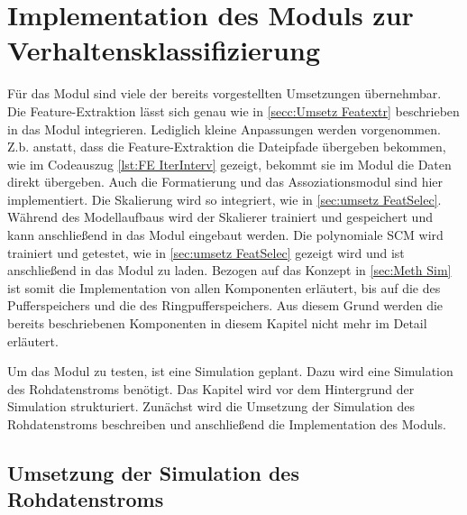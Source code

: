 \section{Implementation des Moduls zur Verhaltensklassifizierung} \label{sec:umse ModulKonzept}
Für das Modul sind viele der bereits vorgestellten Umsetzungen übernehmbar. Die Feature-Extraktion lässt sich genau wie in \autoref{secc:Umsetz Featextr} beschrieben in das Modul integrieren. Lediglich kleine Anpassungen werden vorgenommen. Z.b. anstatt, dass die Feature-Extraktion die Dateipfade übergeben bekommen, wie im Codeauszug \ref{lst:FE IterInterv} gezeigt, bekommt sie im Modul die Daten direkt übergeben. Auch die Formatierung und das Assoziationsmodul sind hier implementiert. Die Skalierung wird so integriert, wie in \autoref{sec:umsetz FeatSelec}. Während des Modellaufbaus wird der Skalierer trainiert und gespeichert und kann anschließend in das Modul eingebaut werden. Die polynomiale SCM wird trainiert und getestet, wie in \autoref{sec:umsetz FeatSelec} gezeigt wird und ist anschließend in das Modul zu laden. Bezogen auf das Konzept in \autoref{sec:Meth Sim} ist somit die Implementation von allen Komponenten erläutert, bis auf die des Pufferspeichers und die des Ringpufferspeichers. Aus diesem Grund werden die bereits beschriebenen Komponenten in diesem Kapitel nicht mehr im Detail erläutert.\par

Um das Modul zu testen, ist eine Simulation geplant. Dazu wird eine Simulation des Rohdatenstroms benötigt. Das Kapitel wird vor dem Hintergrund der Simulation strukturiert. Zunächst wird die Umsetzung der Simulation des Rohdatenstroms beschreiben und anschließend die Implementation des Moduls.

\subsection{Umsetzung der Simulation des Rohdatenstroms}


